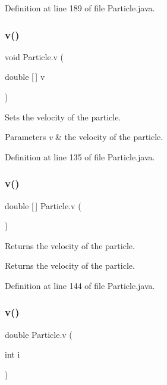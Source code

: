 Definition at line 189 of file Particle.\+java.

\mbox{\label{class_particle_ad8901cfd25505e1bb17464d3d9eb03f1}} 
\subsubsection{\texorpdfstring{v()}{v()}\hspace{0.1cm}{\footnotesize\ttfamily [1/3]}}
{\footnotesize\ttfamily void Particle.\+v (\begin{DoxyParamCaption}\item[{double \mbox{[}$\,$\mbox{]}}]{v }\end{DoxyParamCaption})}

Sets the velocity of the particle. 
\begin{DoxyParams}{Parameters}
{\em v} & the velocity of the particle. \\
\hline
\end{DoxyParams}


Definition at line 135 of file Particle.\+java.

\mbox{\label{class_particle_a82665a73d72400706763a8fe62a4b677}} 
\subsubsection{\texorpdfstring{v()}{v()}\hspace{0.1cm}{\footnotesize\ttfamily [2/3]}}
{\footnotesize\ttfamily double \mbox{[}$\,$\mbox{]} Particle.\+v (\begin{DoxyParamCaption}{ }\end{DoxyParamCaption})}

Returns the velocity of the particle. \begin{DoxyReturn}{Returns}
the velocity of the particle. 
\end{DoxyReturn}


Definition at line 144 of file Particle.\+java.

\mbox{\label{class_particle_aa7e430520821b6650d829f3b51752d01}} 
\subsubsection{\texorpdfstring{v()}{v()}\hspace{0.1cm}{\footnotesize\ttfamily [3/3]}}
{\footnotesize\ttfamily double Particle.\+v (\begin{DoxyParamCaption}\item[{int}]{i }\end{DoxyParamCaption})}

